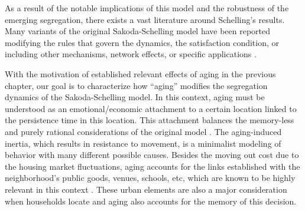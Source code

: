 As a result of the notable implications of this model and the robustness of the emerging segregation, there exists a vast literature around Schelling's results. Many variants of the original Sakoda-Schelling model have been reported modifying the rules that govern the dynamics, the satisfaction condition, or including other mechanisms, network effects, or specific applications \cite{Vinkovic,stauffer-2007,Dall_Asta_2008,gracia-lazaro-2009,gracia-2011,Gauvin_2009,Gauvin_2010,domic-2011,henry-2011,unified,Interfacial_roughening,stauffer-2013,lenormand-2015,barmpalias-2018,jensen-2018,holden-2019,sert-2020,agarwal-2020,vieira-2020,ortega-2021,ortega-2021.2}.

With the motivation of established relevant effects of aging in the previous chapter, our goal is to characterize how ``aging'' modifies the segregation dynamics of the Sakoda-Schelling model. In this context, aging must be understood as an emotional/economic attachment to a certain location linked to the persistence time in this location. This attachment balances the memory-less and purely rational considerations of the original model \cite{granovetter-1985}. The aging-induced inertia, which results in resistance to movement, is a minimalist modeling of behavior with many different possible causes. Besides the moving out cost due to the housing market fluctuations, aging accounts for the links established with the neighborhood’s public goods, venues, schools, etc, which are known to be highly relevant in this context \cite{wasserman-2001,chetty-2016,silver-2021}. These urban elements are also a major consideration when households locate \cite{denton1995persistence,clark-2002,clark-2003,silver2016scenescapes} and aging also accounts for the memory of this decision.


